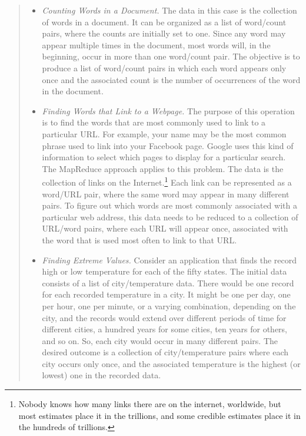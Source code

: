 \begin{quote}
\begin{itemize}
\item \emph{Counting Words in a Document.}  The data in this
case is the collection of words in a document.  It can be
organized as a list of word/count pairs, where the counts
are initially set to one.  Since any word may appear
multiple times in the document, most words will, in the beginning,
occur in more than one word/count pair.
The objective is to produce a list of word/count pairs
in which each word appears only once and the associated
count is the number of occurrences of
the word in the document.

\item \emph{Finding Words that Link to a Webpage.}  The
purpose of this operation is to find the words that are
most commonly used to link to a particular URL. 
For example, your name may be the most  
common phrase used to link into your Facebook page. 
Google uses this kind of information to select which
pages to display for a particular search.
The MapReduce approach applies to this problem.
The data is the
collection of links on the Internet.\footnote{Nobody knows how many
links there are on the internet, worldwide,
but most estimates place it in the trillions,
and some credible estimates place it in the hundreds of trillions. }
Each link can be represented as a word/URL pair,
where the same word may appear in many different pairs.
To figure out which words are most commonly associated with
a particular web address,
this data needs to be reduced to a collection of
URL/word pairs, where each URL will appear once, associated
with the word that is used most often to link to that URL.

\item \emph{Finding Extreme Values.}  Consider
an application that finds the record high or low temperature
for each of the fifty states.  
The initial data consists of a list of
city/temperature data.  There would be one record for each
recorded temperature in a city. It might be one per day,
one per hour, one per minute, or a varying combination,
depending on the city, and the records would extend over
different periods of time for different cities,
a hundred years for some cities, ten years for others,
and so on. So, each city would occur in many different pairs.
The desired outcome is a collection of city/temperature
pairs where each city occurs only once, and the associated
temperature is the highest (or lowest) one in the recorded data.
\end{itemize}
\end{quote}

